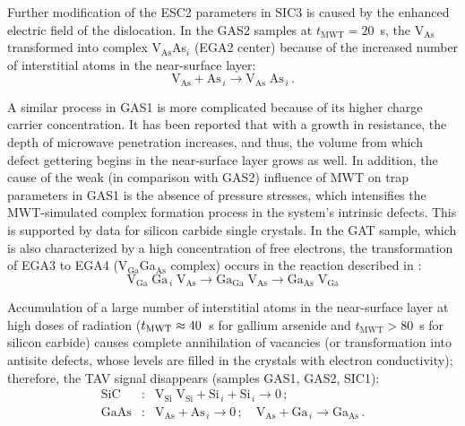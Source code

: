 \documentclass[10pt]{iopart}
\begin{document}
Further modification of the ESC2 parameters in SIC3 is caused by the enhanced electric field of the dislocation.
In the GAS2 samples at $t_\mathrm{MWT}=20$~s,
the V$_\mathrm{As}$ transformed into complex V$_\mathrm{As}$As$_i$
(EGA2 center)
because of the increased number of interstitial atoms in the near-surface layer:
\begin{equation*}
\mathrm{V}_\mathrm{As}+ \mathrm{As}_{\,i} \rightarrow \mathrm{V}_\mathrm{As}\;\mathrm{As}_{\,i}\,.
\end{equation*}

A similar process in GAS1 is more complicated because of its higher charge carrier concentration.
It has been reported \cite{ZOHM2000} that with a growth in resistance, the depth of microwave penetration increases,
and thus, the volume from which defect gettering begins in the near-surface layer grows as well.
In addition, the cause of the weak (in comparison with GAS2) influence of MWT on trap parameters in GAS1 is the absence of pressure stresses,
which intensifies the MWT-simulated complex formation process in the system’s intrinsic defects.
This is supported by data for silicon carbide single crystals.
In the GAT sample, which is also characterized by a high concentration of free electrons,
the transformation of EGA3 to EGA4 (V$_\mathrm{Ga}$Ga$_\mathrm{As}$ complex) occurs in the reaction described in \cite{FANG1990}:
\begin{equation*}
  \mathrm{V}_\mathrm{Ga}\;\mathrm{Ga}_{\,i}\;\mathrm{V}_\mathrm{As}\rightarrow \mathrm{Ga}_\mathrm{Ga}\;\mathrm{V}_\mathrm{As}
  \rightarrow \mathrm{Ga}_\mathrm{As}\;\mathrm{V}_\mathrm{Ga}
\end{equation*}

Accumulation of a large number of interstitial atoms in the near-surface layer at high doses of radiation
($t_{\rm MWT}\approx40$~s for gallium arsenide and $t_\mathrm{MWT}>80$~s for silicon carbide)
causes complete annihilation of vacancies (or transformation into antisite defects, whose levels are filled in the crystals with electron conductivity);
 therefore, the TAV signal disappears (samples GAS1, GAS2, SIC1):
\begin{eqnarray}
  \nonumber
  \mathrm{SiC}&:&\mathrm{V}_\mathrm{Si}\;\mathrm{V}_\mathrm{Si}+\mathrm{Si}_{\,i}+ \mathrm{Si}_{\,i} \rightarrow 0\,;\\
  \nonumber
  \mathrm{GaAs}&:&\mathrm{V}_\mathrm{As}+\mathrm{As}_{\,i} \rightarrow 0\,;\quad
  \mathrm{V}_\mathrm{As}+\mathrm{Ga}_{\,i} \rightarrow \mathrm{Ga}_\mathrm{As}\,.
\end{eqnarray}
\end{document}
